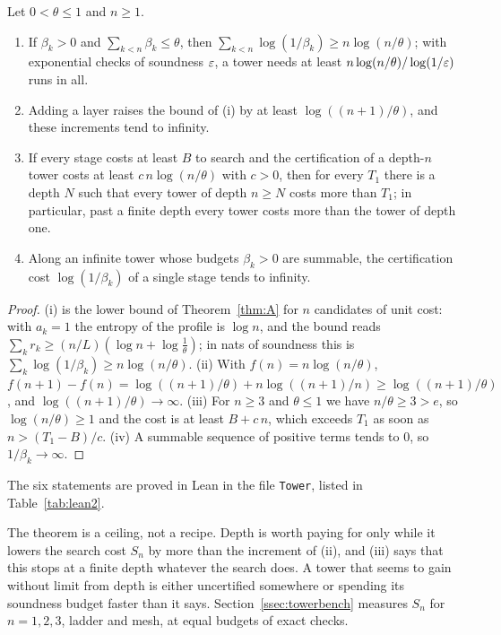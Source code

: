 \begin{theorem}\label{thm:tower}
Let $0<\theta\le1$ and $n\ge1$.
\begin{enumerate}[label=\textup{(\roman*)},leftmargin=2.2em,itemsep=1pt]
\item If $\beta_{k}>0$ and $\sum_{k<n}\beta_{k}\le\theta$, then $\sum_{k<n}\log(1/\beta_{k})\ge n\log(n/\theta)$; with exponential checks of soundness $\varepsilon$, a tower needs at least $n\log(n/\theta)/\log(1/\varepsilon)$ runs in all.
\item Adding a layer raises the bound of \textup{(i)} by at least $\log((n+1)/\theta)$, and these increments tend to infinity.
\item If every stage costs at least $B$ to search and the certification of a depth-$n$ tower costs at least $c\,n\log(n/\theta)$ with $c>0$, then for every $T_{1}$ there is a depth $N$ such that every tower of depth $n\ge N$ costs more than $T_{1}$; in particular, past a finite depth every tower costs more than the tower of depth one.
\item Along an infinite tower whose budgets $\beta_{k}>0$ are summable, the certification cost $\log(1/\beta_{k})$ of a single stage tends to infinity.
\end{enumerate}
\end{theorem}

\begin{proof}
(i) is the lower bound of Theorem~\ref{thm:A} for $n$ candidates of unit cost: with $a_{k}=1$ the entropy of the profile is $\log n$, and the bound reads $\sum_{k}r_{k}\ge(n/L)(\log n+\log\frac1\theta)$; in nats of soundness this is $\sum_{k}\log(1/\beta_{k})\ge n\log(n/\theta)$. (ii) With $f(n)=n\log(n/\theta)$, $f(n+1)-f(n)=\log((n+1)/\theta)+n\log((n+1)/n)\ge\log((n+1)/\theta)$, and $\log((n+1)/\theta)\to\infty$. (iii) For $n\ge3$ and $\theta\le1$ we have $n/\theta\ge3>e$, so $\log(n/\theta)\ge1$ and the cost is at least $B+c\,n$, which exceeds $T_{1}$ as soon as $n>(T_{1}-B)/c$. (iv) A summable sequence of positive terms tends to $0$, so $1/\beta_{k}\to\infty$.
\end{proof}

The six statements are proved in Lean in the file \texttt{Tower}, listed in Table~\ref{tab:lean2}.

The theorem is a ceiling, not a recipe. Depth is worth paying for only while it lowers the search cost $S_{n}$ by more than the increment of (ii), and (iii) says that this stops at a finite depth whatever the search does. A tower that seems to gain without limit from depth is either uncertified somewhere or spending its soundness budget faster than it says. Section~\ref{ssec:towerbench} measures $S_{n}$ for $n=1,2,3$, ladder and mesh, at equal budgets of exact checks.

